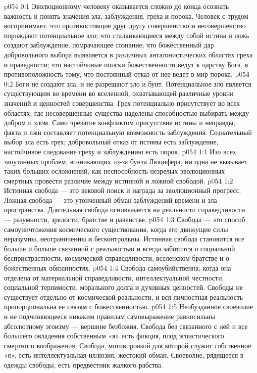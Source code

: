 \author{Могучий Вестник}
\vs p054 0:1 Эволюционному человеку оказывается сложно до конца осознать важность и понять значения зла, заблуждения, греха и порока. Человек с трудом воспринимает, что противостоящие друг другу совершенство и несовершенство порождают потенциальное зло; что сталкивающиеся между собой истина и ложь создают заблуждение, помрачающее сознание; что божественный дар добровольного выбора выявляется в различных антагонистических областях греха и праведности; что настойчивые поиски божественности ведут к царству Бога, в противоположность тому, что постоянный отказ от нее ведет в мир порока.
\vs p054 0:2 Боги не создают зла, и не разрешают зло и бунт. Потенциальное зло является существующим во времени во вселенной, охватывающей различные уровни значений и ценностей совершенства. Грех потенциально присутствует во всех областях, где несовершенные существа наделены способностью выбирать между добром и злом. Само чреватое конфликтом присутствие истины и неправды, факта и лжи составляет потенциальную возможность заблуждения. Сознательный выбор зла есть грех; добровольный отказ от истины есть заблуждение, настойчивое следование греху и заблуждению есть порок.
\vs p054 1:1 Изо всех запутанных проблем, возникающих из\hyp{}за бунта Люцифера, ни одна не вызывает таких больших осложнений, как неспособность незрелых эволюционных смертных провести различие между истинной и ложной свободой.
\vs p054 1:2 Истинная свобода --- это вековой поиск и награда за эволюционный прогресс. Ложная свобода --- это утонченный обман заблуждений времени и зла пространства. Длительная свобода основывается на реальности справедливости --- разумности, зрелости, братстве и равенстве.
\vs p054 1:3 Свобода --- это способ самоуничтожения космического существования, когда его движущие силы неразумны, неограниченны и бесконтрольны. Истинная свобода становится все больше и больше связанной с реальностью и всегда заботится о социальной беспристрастности, космической справедливости, вселенском братстве и о божественных обязанностях.
\vs p054 1:4 Свобода самоубийственна, когда она отделена от материальной справедливости, интеллектуальной честности, социальной терпимости, морального долга и духовных ценностей. Свободы не существует отдельно от космической реальности, и вся личностная реальность пропорциональна ее связям с божественностью.
\vs p054 1:5 Необузданное своеволие и не подчиняющееся никаким правилам самовыражение равносильны абсолютному эгоизму --- вершине безбожия. Свобода без связанного с ней и все большего овладения собственным «я» есть фикция, плод эгоистического смертного воображения. Свобода, мотивировкой для которой служит собственное «я», есть интеллектуальная иллюзия, жестокий обман. Своеволие, рядящееся в одежды свободы, есть предвестник жалкого рабства.
